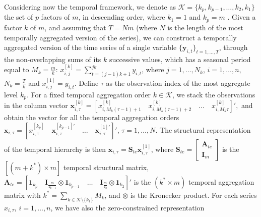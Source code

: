\documentclass[a4paper,11pt]{article}
\newcommand{\Unovet}{\bm{1}}
\newcommand{\xvet}{\bm{x}}
\newcommand{\yvet}{\bm{y}}
\newcommand{\Avet}{\bm{A}}
\newcommand{\Ivet}{\bm{I}}
\newcommand{\Svet}{\bm{S}}
\theoremstyle{definition}
\begin{document}
Considering now the temporal framework, we denote as $\mathcal{K} = \{ k_p , k_{p-1}, \dots, k_2, k_1 \}$ the set of $p$ factors of $m$, in descending order, where $k_1= 1$ and $k_p= m$ \citep{athanasopoulos2017}. Given a factor $k$ of $m$, and assuming that $T = N m$ (where $N$ is the length of the most temporally aggregated version of the series), we can construct a temporally aggregated version of the time series of a single variable $\{\yvet_{i,t}\}_{t = 1, \dots, T}$, through the non-overlapping sums of its $k$ successive values, which has a seasonal period equal to $M_k= \displaystyle\frac{m}{k}$: $x_{i,j}^{[k]} = \displaystyle\sum_{t=(j-1)k+1}^{jk} y_{i,t}$, where $j = 1,\dots, N_k$, $i = 1,\dots,n$, $N_k = \displaystyle\frac{T}{k}$ and $x_{i,j}^{[1]}=y_{i,t}$. Define $\tau$ as the observation index of the most aggregate level $k_p$. For a fixed temporal aggregation order $k \in \mathcal{K}$, we stack the observations in the column vector $\xvet_{i,\tau}^{[k]} = \left[x_{i,M_k(\tau-1)+1}^{[k]} \quad x_{i,M_k(\tau-1)+2}^{[k]} \quad \dots \quad x_{i,M_k\tau}^{[k]}\right]',$ and obtain the vector for all the temporal aggregation orders $\xvet_{i,\tau} = \left[x_{i,\tau}^{[k_p]} \quad \xvet_{i,\tau}^{[k_{p-1}]\prime} \quad \dots \quad \xvet_{i,\tau}^{[1]\prime} \right]'$, $\tau = 1,\dots,N$. The structural representation of the temporal hierarchy \citep{athanasopoulos2017} is then $\xvet_{i,\tau} = \Svet_{te}\xvet_{i,\tau}^{[1]}$, where $\Svet_{te} = \left[\begin{array}{c}
	\Avet_{te} \\
	\Ivet_{m}
\end{array}\right]$ is the $[(m+k^\ast) \times m]$ temporal structural matrix, $\Avet_{te} = \left[\Unovet_{k_p} \quad \Ivet_{\frac{m}{k_{p-1}}} \otimes \Unovet_{k_{p-1}} \quad \dots \quad \Ivet_{\frac{m}{k_{2}}}  \otimes \Unovet_{k_2} \right]'$
is the $(k^\ast \times m)$ temporal aggregation matrix with $k^\ast = \displaystyle\sum_{k \in \mathcal{K}\setminus\{k_1\}} M_k$, and $\otimes$ is the Kronecker product. For each series $x_{i,\tau}$, $i = 1,\dots,n$, we have also the zero-constrained representation
\end{document}
